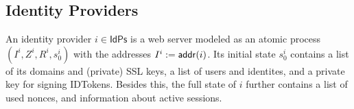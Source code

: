 \documentclass[letterpaper,onecolumn,10pt]{article}
\begin{document}
\begin{algorithmic}[1]
      \mystop{}
    \ENDIF
    \ENDIF
    \ENDIF
    \ENDIF
    \label{line:gen-acct}
    \label{line:add-service-token}
  \ENDIF
  \mystop{}
\end{algorithmic}\setlength{\parindent}{1em}

\subsection{Identity Providers} \label{app:idps}

An identity provider $i \in \mathsf{IdPs}$ is a web server modeled as
an atomic process $(I^i, Z^i, R^i, s_0^i)$ with the addresses 
$I^i := \mathsf{addr}(i)$. Its initial state $s^i_0$ contains a list of its 
domains and (private) SSL keys, a list of users and identites, and a private key 
for signing IDTokens. Besides this, the full state of $i$ further contains a list 
of used nonces, and information about active sessions.
\end{document}
